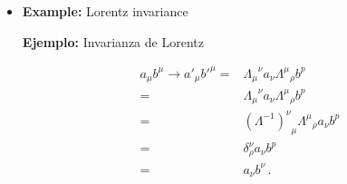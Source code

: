 \begin{itemize}
\item
\begin{english}
\textbf{Example:} Lorentz invariance    
\end{english}
\begin{spanish}
\textbf{Ejemplo:} Invarianza de Lorentz
\end{spanish}
  \begin{align}
    a_\mu b^\mu\to a'_\mu{b'}^\mu=&{\Lambda_\mu}^\nu a_\nu{\Lambda^\mu}_\rho b^p \nonumber\\
    =&{\Lambda_\mu}^\nu a_\nu{\Lambda^\mu}_\rho b^p \nonumber\\
    =&{\left(\Lambda^{-1}\right)^\nu}_\mu{\Lambda^\mu}_\rho a_\nu b^p \nonumber\\
    =&\delta^\nu_\rho a_\nu b^p \nonumber\\
    =&a_\nu b^\nu \nonumber\,.
  \end{align}

\end{itemize}



